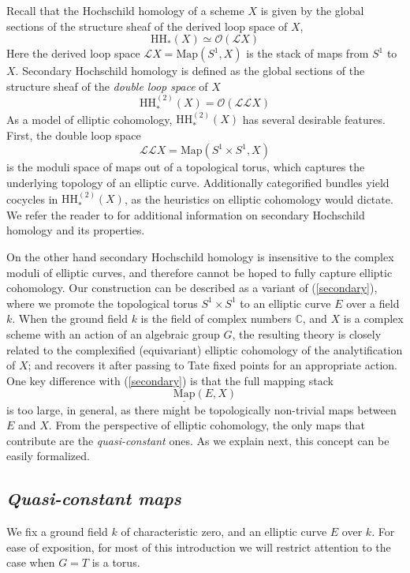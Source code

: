 \documentclass[11pt,letterpaper]{amsart}
\newcommand{\cO}{\mathcal{O}}
\newcommand{\cL}{\mathcal{L}}
\newcommand{\Map}[2]{\underline{\mathrm{Map}}\left (#1,#2\right )}
\begin{document}
Recall that the Hochschild homology of a scheme $X$ is given by the global sections of the structure sheaf of the derived loop space of $X$,
$$
\mathrm{HH}_*(X) \simeq \cO(\cL X)
$$
Here the derived loop space $\cL X = \mathrm{Map}(S^1, X)$ is the stack of maps from $S^1$ to $X$. Secondary Hochschild homology is defined as the global sections of the structure sheaf of the \emph{double loop space} of $X$
\begin{equation}
\label{secondary}
\mathrm{HH}^{(2)}_*(X) = \cO(\cL\cL  X)
\end{equation}
As a model of elliptic cohomology, $\mathrm{HH}^{(2)}_*(X)$ has several desirable features. First, the double loop space 
$$
\cL\cL X = \mathrm{Map}(S^1 \times S^1, X)
$$
is the moduli space of maps out of a topological torus, which captures the underlying topology of an elliptic curve. Additionally  categorified bundles  yield cocycles in $
\mathrm{HH}^{(2)}_*(X)$, as the  heuristics on elliptic cohomology  would dictate. We refer the reader to \cite{HSS, HSSS} for additional information on secondary Hochschild homology and its properties. 

On the other hand secondary Hochschild homology is insensitive to the complex moduli of elliptic curves, and therefore cannot be hoped to fully capture elliptic cohomology. Our construction can be described as a variant of  (\ref{secondary}), where we promote  the topological torus $S^1 \times S^1$ to an elliptic curve $E$ over a field $k$. When the ground field $k$ is the field of complex numbers $\mathbb{C}$, and $X$ is a complex scheme with an action of an algebraic group $G$, the resulting theory is closely related to the complexified (equivariant) elliptic cohomology of the analytification of $X$; and recovers it after passing to Tate fixed points for an appropriate action. One key difference with (\ref{secondary})  is that the full mapping stack 
$$
\Map{E}{X}
$$
is too large, in general, as there might be topologically non-trivial maps between $E$ and $X$. From the perspective of elliptic cohomology, the only maps that contribute are the \emph{quasi-constant} ones. As we explain next, this concept can be easily formalized.

\subsection*{\emph{Quasi-constant maps}}
We fix a ground field $k$ of characteristic zero, and an elliptic curve $E$ over $k$. For ease of exposition,  for most of this introduction we will restrict attention to the case when $G=T$ is 
a torus.  
\end{document}

